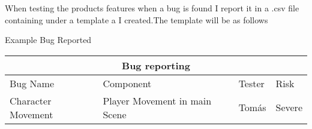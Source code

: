 When testing the products features when a bug is found I report it in a  .csv file containing under a template a I created.The template will be as follows




\centerline{Example Bug Reported}

\setlength{\arrayrulewidth}{1mm}
\setlength{\tabcolsep}{18pt}
\renewcommand{\arraystretch}{2.5}

\begin{tabular}{ |p{2.5cm}|p{2.5cm}|p{2.5cm}||p{2.5cm}|  }
\hline
\multicolumn{4}{|c|}{Bug reporting  } \\
\hline
Bug Name      & Component  & Tester & Risk \\
\hline
Character Movement   & Player Movement in main Scene & Tomás & Severe \\
\hline

\end{tabular}

